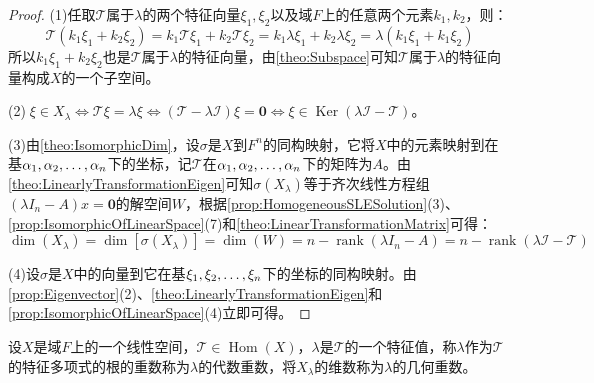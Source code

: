 \begin{proof}
	(1)任取$\mathcal{T}$属于$\lambda$的两个特征向量$\xi_1,\xi_2$以及域$F$上的任意两个元素$k_1,k_2$，则：
	\begin{equation*}
		\mathcal{T}(k_1\xi_1+k_2\xi_2)=k_1\mathcal{T}\xi_1+k_2\mathcal{T}\xi_2=k_1\lambda\xi_1+k_2\lambda\xi_2=\lambda(k_1\xi_1+k_1\xi_2)
	\end{equation*}
	所以$k_1\xi_1+k_2\xi_2$也是$\mathcal{T}$属于$\lambda$的特征向量，由\cref{theo:Subspace}可知$\mathcal{T}$属于$\lambda$的特征向量构成$X$的一个子空间。\par
	(2)$\;\xi\in X_{\lambda}\iff\mathcal{T}\xi=\lambda\xi\iff(\mathcal{T}-\lambda\mathcal{I})\xi=\mathbf{0}\iff\xi\in\operatorname{Ker}(\lambda\mathcal{I}-\mathcal{T})$。\par
	(3)由\cref{theo:IsomorphicDim}，设$\sigma$是$X$到$F^n$的同构映射，它将$X$中的元素映射到在基$\alpha_1, \alpha_2, \dots, \alpha_{n}$下的坐标，记$\mathcal{T}$在$\alpha_1, \alpha_2, \dots, \alpha_{n}$下的矩阵为$A$。由\cref{theo:LinearlyTransformationEigen}可知$\sigma(X_{\lambda})$等于齐次线性方程组$(\lambda I_n-A)x=\mathbf{0}$的解空间$W$，根据\cref{prop:HomogeneousSLESolution}(3)、\cref{prop:IsomorphicOfLinearSpace}(7)和\cref{theo:LinearTransformationMatrix}可得：
	\begin{equation*}
		\dim(X_{\lambda})=\dim[\sigma(X_\lambda)]=\dim(W)=n-\operatorname{rank}(\lambda I_n-A)=n-\operatorname{rank}(\lambda\mathcal{I}-\mathcal{T})
	\end{equation*}\par
	(4)设$\sigma$是$X$中的向量到它在基$\xi_1, \xi_2, \dots, \xi_{n}$下的坐标的同构映射。由\cref{prop:Eigenvector}(2)、\cref{theo:LinearlyTransformationEigen}和\cref{prop:IsomorphicOfLinearSpace}(4)立即可得。
\end{proof}
\begin{definition}
	设$X$是域$F$上的一个线性空间，$\mathcal{T}\in\operatorname{Hom}(X)$，$\lambda$是$\mathcal{T}$的一个特征值，称$\lambda$作为$\mathcal{T}$的特征多项式的根的重数称为$\lambda$的代数重数，将$X_{\lambda}$的维数称为$\lambda$的几何重数。
\end{definition}
